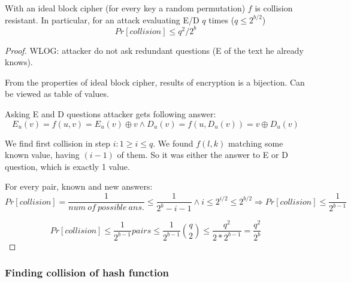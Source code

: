 \begin{theorem}
	With an ideal block cipher (for every key a random permutation) $f$ is collision resistant. In particular, for an attack evaluating E/D $q$ times ($q \leq 2^{b/2}$)
	\[ Pr[collision] \leq q^2/2^b \]
\end{theorem}
\begin{proof}
	WLOG: attacker do not ask redundant questions (E of the text he already knows).

	From the properties of ideal block cipher, results of encryption is a bijection. Can be viewed as table of values.

	Asking E and D questions attacker gets following answer:
	\[ E_u(v) = f(u,v) = E_u(v) \oplus v \land D_u(v) = f(u, D_u(v)) = v \oplus D_u(v) \]

	We find first collision in step $i: 1 \geq i \leq q$. We found $f(l,k)$ matching some known value, having $(i - 1)$ of them.
	So it was either the answer to E or D question, which is exactly 1 value.

	For every pair, known and new answers:
	\[ Pr[collision] = \frac{1}{num\ of\ possible\ ans.} \leq \frac{1}{2^b - i - 1} \land i \leq 2^{i/2} \leq 2^{b/2} \Rightarrow Pr[collision] \leq \frac{1}{2^{b-1}} \]

	\[ Pr[collision] \leq \frac{1}{2^{b-1}} pairs \leq \frac{1}{2^{b-1}} \binom{q}{2} \leq \frac{q^2}{2*2^{b-1}} = \frac{q^2}{2^{b}} \]

\end{proof}

\subsubsection{Finding collision of hash function}

